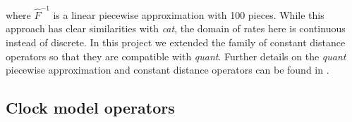 \documentclass[10pt,letterpaper]{article}
\begin{document}
where $\hat{F}^{-1}$ is a linear piecewise approximation with 100 pieces.
While this approach has clear similarities with \textit{cat}, the domain of rates here is continuous instead of discrete.
In this project we extended the family of constant distance operators  \cite{zhang2020improving} so that they are compatible with \textit{quant}.
Further details on the \textit{quant} piecewise approximation and constant distance operators can be found in \textbf{}. 
















\clearpage
\subsection*{Clock model operators}
\label{sect:clockModelOperators}
\end{document}
